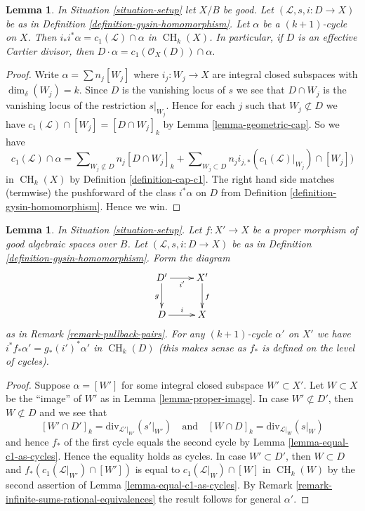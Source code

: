\documentclass{stacks-project}
\theoremstyle{plain}
\newtheorem{lemma}[subsection]{Lemma}
\theoremstyle{definition}
\theoremstyle{remark}
\numberwithin{equation}{subsection}
\def\CH{\mathop{\mathrm{CH}}\nolimits}
\begin{document}
\begin{lemma}
\label{lemma-support-cap-effective-Cartier}
In Situation \ref{situation-setup} let $X/B$ be good. Let
$(\mathcal{L}, s, i : D \to X)$ be as in
Definition \ref{definition-gysin-homomorphism}. Let $\alpha$ be a
$(k + 1)$-cycle on $X$. Then $i_*i^*\alpha = c_1(\mathcal{L}) \cap \alpha$
in $\CH_k(X)$. In particular, if $D$ is an effective Cartier divisor, then
$D \cdot \alpha = c_1(\mathcal{O}_X(D)) \cap \alpha$.
\end{lemma}

\begin{proof}
Write $\alpha = \sum n_j[W_j]$ where $i_j : W_j \to X$ are integral closed
subspaces with $\dim_\delta(W_j) = k$.
Since $D$ is the vanishing locus of $s$ we see that
$D \cap W_j$ is the vanishing locus
of the restriction $s|_{W_j}$. Hence for each $j$ such that
$W_j \not \subset D$ we have
$c_1(\mathcal{L}) \cap [W_j] = [D \cap W_j]_k$
by Lemma \ref{lemma-geometric-cap}. So we have
$$
c_1(\mathcal{L}) \cap \alpha
=
\sum\nolimits_{W_j \not \subset D} n_j[D \cap W_j]_k
+
\sum\nolimits_{W_j \subset D}
n_j i_{j, *}(c_1(\mathcal{L})|_{W_j}) \cap [W_j])
$$
in $\CH_k(X)$ by Definition \ref{definition-cap-c1}.
The right hand side matches (termwise) the pushforward of the class
$i^*\alpha$ on $D$ from Definition \ref{definition-gysin-homomorphism}.
Hence we win.
\end{proof}

\begin{lemma}
\label{lemma-closed-in-X-gysin}
In Situation \ref{situation-setup}. Let $f : X' \to X$ be a proper morphism
of good algebraic spaces over $B$. Let $(\mathcal{L}, s, i : D \to X)$ be as in
Definition \ref{definition-gysin-homomorphism}.
Form the diagram
$$
\xymatrix{
D' \ar[d]_g \ar[r]_{i'} & X' \ar[d]^f \\
D \ar[r]^i & X
}
$$
as in Remark \ref{remark-pullback-pairs}.
For any $(k + 1)$-cycle $\alpha'$ on $X'$ we have
$i^*f_*\alpha' = g_*(i')^*\alpha'$ in $\CH_k(D)$
(this makes sense as $f_*$ is defined on the level of cycles).
\end{lemma}

\begin{proof}
Suppose $\alpha = [W']$ for some integral closed subspace
$W' \subset X'$. Let $W \subset X$ be the ``image'' of $W'$
as in Lemma \ref{lemma-proper-image}. In case $W' \not \subset D'$,
then $W \not \subset D$ and we see that
$$
[W' \cap D']_k = \text{div}_{\mathcal{L}'|_{W'}}({s'|_{W'}})
\quad\text{and}\quad
[W \cap D]_k = \text{div}_{\mathcal{L}|_W}(s|_W)
$$
and hence $f_*$ of the first cycle equals the second cycle by
Lemma \ref{lemma-equal-c1-as-cycles}. Hence the
equality holds as cycles. In case $W' \subset D'$, then
$W \subset D$ and $f_*(c_1(\mathcal{L}|_{W'}) \cap [W'])$
is equal to $c_1(\mathcal{L}|_W) \cap [W]$ in $\CH_k(W)$ by the second
assertion of Lemma \ref{lemma-equal-c1-as-cycles}.
By Remark \ref{remark-infinite-sums-rational-equivalences}
the result follows for general $\alpha'$.
\end{proof}
\end{document}
